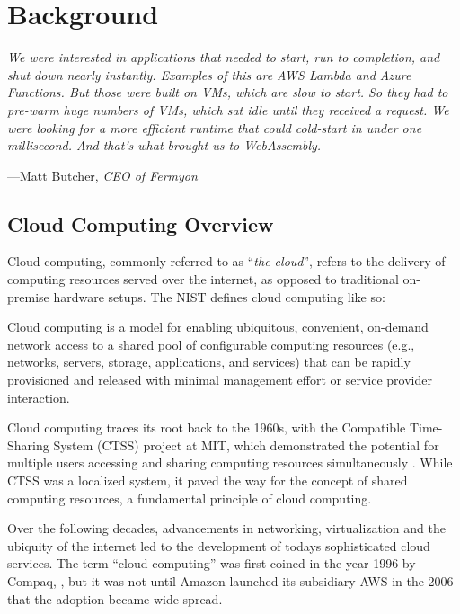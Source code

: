 \documentclass[
  table]{report}
\begin{document}
\newpage

\chapter{Background}
\label{chap:background}

\setlength{}

\epigraph{\itshape  
We were interested in
applications that needed to start, run to completion, and shut down nearly
instantly. Examples of this are AWS Lambda and Azure Functions. But those were
built on VMs, which are slow to start. So they had to pre-warm huge numbers of
VMs, which sat idle until they received a request. We were looking for a more
efficient runtime that could cold-start in under one millisecond. And that’s
what brought us to WebAssembly.
}{---Matt Butcher, \textit{CEO of Fermyon}}

\section{Cloud Computing Overview}
\label{sect:cloud-overview}

Cloud computing, commonly referred to as ``\emph{the cloud}'', refers to
the delivery of computing resources served over the internet, as opposed
to traditional on-premise hardware setups. The \ac{NIST} defines cloud
computing like so:

\begin{tcolorbox}[
  definitionstyle,
  title=NIST definition of Cloud Computing,
]
Cloud computing is a model for enabling ubiquitous, convenient, on-demand
network access to a shared pool of configurable computing resources (e.g.,
networks, servers, storage, applications, and services) that can be rapidly
provisioned and released with minimal management effort or service provider
interaction. \\

\hfill \citep{nist-def}

\end{tcolorbox}

Cloud computing traces its root back to the 1960s, with the Compatible
Time-Sharing System (CTSS) project at MIT, which demonstrated the
potential for multiple users accessing and sharing computing resources
simultaneously \citep{crisman1963}. While CTSS was a localized system,
it paved the way for the concept of shared computing resources, a
fundamental principle of cloud computing.

Over the following decades, advancements in networking, virtualization
and the ubiquity of the internet led to the development of todays
sophisticated cloud services. The term ``cloud computing'' was first
coined in the year 1996 by Compaq,
\citep{favaloroInternetSolutionsDivision1996}, but it was not until
Amazon launched its subsidiary \ac{AWS} in the 2006 that the adoption
became wide spread.
\end{document}
